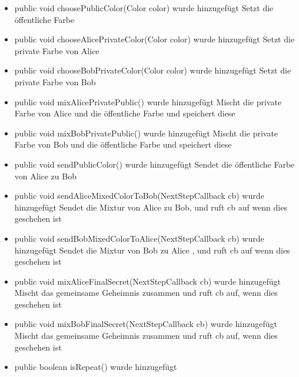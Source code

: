 \documentclass{article}
\begin{document}
\begin{itemize}
           \item public void choosePublicColor(Color color) wurde hinzugefügt\newline
               Setzt die öffentliche Farbe
           \item public void chooseAlicePrivateColor(Color color) wurde hinzugefügt\newline
               Setzt die private Farbe von Alice
           \item public void chooseBobPrivateColor(Color color) wurde hinzugefügt\newline
               Setzt die private Farbe von Bob
           \item public void mixAlicePrivatePublic() wurde hinzugefügt\newline
               Mischt die private Farbe von Alice und die öffentliche Farbe
               und speichert diese
           \item public void mixBobPrivatePublic() wurde hinzugefügt\newline
               Mischt die private Farbe von Bob und die öffentliche Farbe
               und speichert diese
           \item public void sendPublicColor() wurde hinzugefügt\newline
               Sendet die öffentliche Farbe von Alice zu Bob
           \item public void sendAliceMixedColorToBob(NextStepCallback cb) wurde hinzugefügt\newline
               Sendet die Mixtur von Alice zu Bob, und ruft cb auf wenn dies geschehen ist
           \item public void sendBobMixedColorToAlice(NextStepCallback cb) wurde hinzugefügt\newline
               Sendet die Mixtur von Bob zu Alice , und ruft cb auf wenn dies geschehen ist
           \item public void mixAliceFinalSecret(NextStepCallback cb) wurde hinzugefügt\newline
               Mischt das gemeinsame Geheimnis zusammen und ruft cb auf, wenn dies geschehen ist
           \item public void mixBobFinalSecret(NextStepCallback cb) wurde hinzugefügt\newline
               Mischt das gemeinsame Geheimnis zusammen und ruft cb auf, wenn dies geschehen ist
           \item public boolean isRepeat() wurde hinzugefügt\newline

\end{itemize}
\end{document}
